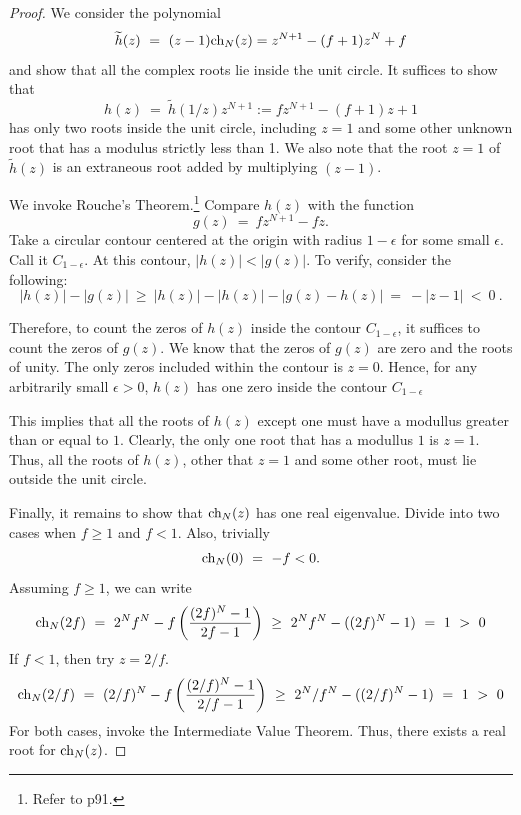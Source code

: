 \documentclass[11pt,reqno]{amsart}
\numberwithin{equation}{section}
\theoremstyle{plain}
\newcommand{\ch}{\textnormal{ch}}
\begin{document}
\begin{proof}
    We consider the polynomial 
    \begin{equation}
        \widetilde h(z) \ = \  (z - 1) \ch_N(z) = z^{N+1} - (f + 1)z^N + f
    \end{equation}
    and show that all the complex roots lie inside the unit circle. 
    It suffices to show that 
    \begin{equation}
        h(z) \ =\ \widetilde h (1/z) z^{N + 1} := fz^{N + 1} - (f+1)z+1
    \end{equation}
    has only two roots inside the unit circle, including $z = 1$ and 
    some other unknown root that has a modulus strictly less than 1. 
    We also note that the root $z = 1$ of $\widetilde{h}(z)$ is an extraneous 
    root added by multiplying $(z - 1)$. 

    We invoke Rouche's Theorem.\footnote{Refer to \cite{SS03} p91. } Compare $h(z)$ with the function 
\begin{equation}
    g(z) \ =\ fz^{N + 1} - f z. 
\end{equation}
    Take a circular contour centered at the origin 
    with radius $1 - \epsilon$ for some small $\epsilon$. Call it $C_{1 - \epsilon}$. 
    At this contour, $|h(z)| < |g(z)|$. To verify, consider the following:
    \begin{equation}
        |h(z)| - |g(z)| \ \geq\  |h(z)| - |h(z)| - |g(z) - h(z)| 
        \ =  \ - |z - 1| \ < \ 0\  .
    \end{equation}

    Therefore, to count the zeros of $h(z)$ inside the contour $C_{1 - \epsilon}$, 
    it suffices to count the zeros of $g(z)$. We know that the zeros of $g(z)$
    are zero and the roots of unity. The only zeros included within the 
    contour is $z = 0$. Hence, for any arbitrarily small $\epsilon > 0$, $h(z)$
    has one zero inside the contour $C_{1 - \epsilon}$

    This implies that all the roots of $h(z)$ except one must have 
    a modullus greater than or equal to $1$. Clearly, the only 
    one root that has a modullus $1$ is $z = 1$. Thus, 
    all the roots of $h(z)$, other that $z = 1$ and some other root, 
    must lie outside the unit circle. 

    Finally, it remains to show that $\ch_N(z)$ has one 
    real eigenvalue. Divide into two cases when $f \geq 1$ 
    and $f < 1$. Also, trivially 
    \[
        \ch_N(0) \ =\ -f < 0 .   
    \] Assuming $f \geq 1$, we can write 
    \[
        \ch_N(2f)\ =\ 2^N f^N  -  f \left(
            \frac {(2f)^N - 1} {2f - 1}
        \right) \
        \geq \  2^Nf^N - ((2f)^N - 1) \ = \  1 \ > \ 0
    \]
    If $f < 1$, then try $z = 2/f$. 
    \[
        \ch_N(2/f) \ = \ (2/f)^N - f \left(
            \frac{(2/f)^N - 1}{2/f - 1}
        \right)
        \ \geq \ 
  2^N/f^N - ((2/f)^N - 1) \ = \  1 \ > \ 0
    \]
For both cases, invoke the Intermediate Value Theorem. Thus, there 
    exists a real root for $\ch_N(z)$. 

\end{proof}
\end{document}
